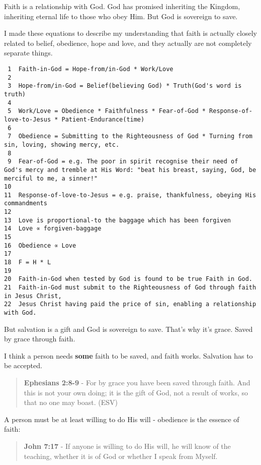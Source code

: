 \documentclass[11pt]{article}
\begin{document}
Faith is a relationship with God. God has promised inheriting the Kingdom, inheriting eternal life to those who obey Him. But God is sovereign to save.

I made these equations to describe my understanding that faith is actually closely related to belief, obedience, hope and love, and they actually are not completely separate things.

\begin{verbatim}
 1  Faith-in-God = Hope-from/in-God * Work/Love
 2  
 3  Hope-from/in-God = Belief(believing God) * Truth(God's word is truth)
 4  
 5  Work/Love = Obedience * Faithfulness * Fear-of-God * Response-of-love-to-Jesus * Patient-Endurance(time)
 6  
 7  Obedience = Submitting to the Righteousness of God * Turning from sin, loving, showing mercy, etc.
 8  
 9  Fear-of-God = e.g. The poor in spirit recognise their need of God's mercy and tremble at His Word: "beat his breast, saying, God, be merciful to me, a sinner!"
10  
11  Response-of-love-to-Jesus = e.g. praise, thankfulness, obeying His commandments
12  
13  Love is proportional-to the baggage which has been forgiven
14  Love ∝ forgiven-baggage
15  
16  Obedience ∝ Love
17  
18  F = H * L
19  
20  Faith-in-God when tested by God is found to be true Faith in God.
21  Faith-in-God must submit to the Righteousness of God through faith in Jesus Christ,
22  Jesus Christ having paid the price of sin, enabling a relationship with God.
\end{verbatim}

But salvation is a gift and God is sovereign to save.
That's why it's grace.
Saved by grace through faith.

I think a person needs \textbf{some} faith to be saved, and faith works. Salvation has to be accepted.

\begin{quote}
\textbf{Ephesians 2:8-9} - For by grace you have been saved through faith. And this is not your own doing; it is the gift of God, not a result of works, so that no one may boast. (ESV)
\end{quote}

A person must be at least willing to do His will - obedience is the essence of faith:

\begin{quote}
\textbf{John 7:17} - If anyone is willing to do His will, he will know of the teaching, whether it is of God or whether I speak from Myself.
\end{quote}
\end{document}
